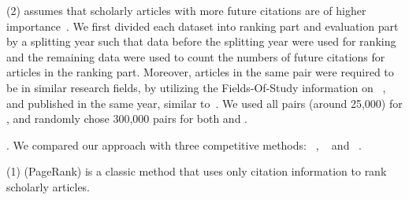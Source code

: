 \noindent
(2) \fcita assumes that scholarly articles with more future citations are of higher importance~\cite{Wang13AAAI,Wang16TIST,Li08TSRanking}.
We first divided each dataset into ranking part and evaluation part by a splitting year such that data before the splitting year were used for ranking and the remaining data were used to count the numbers of future citations for articles in the ranking part.
%
Moreover, articles in the same pair were required to be in similar research fields, by utilizing the Fields-Of-Study information on \magdata~\cite{Sinha15:MAG}, and published in the same year, similar to~\cite{Wang16TIST}.
We used all pairs (around 25,000) for \aan, and randomly chose 300,000 pairs for both \aminer and \magdata.





.
We compared our approach \ensemblerank with three competitive methods: \pagerank~\cite{Brin98:PageRank}, \futurerank~\cite{sayyadi09} and \hhgrank~\cite{Liang16AAAI}.

\noindent
(1) \pagerank (PageRank) is a classic method that uses only citation information to rank scholarly articles.


